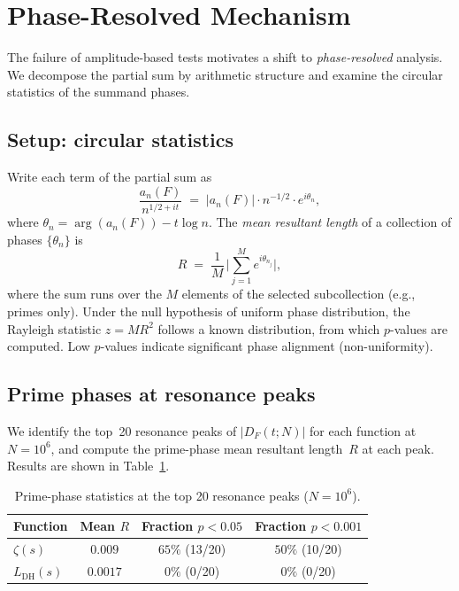 \documentclass[11pt]{amsart}
\theoremstyle{definition}
\theoremstyle{remark}
\renewcommand{\DH}{\mathrm{DH}}
\newcommand{\abs}[1]{\lvert #1 \rvert}
\begin{document}
\section{Phase-Resolved Mechanism}\label{sec:phase}

The failure of amplitude-based tests motivates a shift to
\emph{phase-resolved} analysis.  We decompose the partial sum by
arithmetic structure and examine the circular statistics of the
summand phases.

\subsection{Setup: circular statistics}

Write each term of the partial sum as
\begin{equation}
  \frac{a_n(F)}{n^{1/2+it}}
  \;=\; \abs{a_n(F)} \cdot n^{-1/2} \cdot e^{i\theta_n},
\end{equation}
where $\theta_n = \arg(a_n(F)) - t\log n$.  The \emph{mean resultant
length} of a collection of phases $\{\theta_n\}$ is
\begin{equation}\label{eq:R-stat}
  R \;=\; \frac{1}{M}\,\biggl\lvert
    \sum_{j=1}^{M} e^{i\theta_{n_j}} \biggr\rvert,
\end{equation}
where the sum runs over the $M$ elements of the selected subcollection
(e.g., primes only).  Under the null hypothesis of uniform phase
distribution, the Rayleigh statistic $z = M R^2$ follows a known
distribution, from which $p$-values are computed.  Low $p$-values
indicate significant phase alignment (non-uniformity).

\subsection{Prime phases at resonance peaks}\label{ssec:prime-phases}

We identify the top~20 resonance peaks of $\abs{D_F(t; N)}$ for each
function at $N = 10^6$, and compute the prime-phase mean resultant
length~$R$ at each peak.  Results are shown in
Table~\ref{tab:prime-phases}.

\begin{table}[ht]
\centering
\caption{Prime-phase statistics at the top 20 resonance peaks
  ($N = 10^6$).}
\label{tab:prime-phases}
\begin{tabular}{@{}lccc@{}}
\toprule
Function & Mean $R$ & Fraction $p < 0.05$ &
  Fraction $p < 0.001$ \\
\midrule
$\zeta(s)$    & $0.009$ & $65\%$ (13/20) & $50\%$ (10/20) \\
$L_{\DH}(s)$  & $0.0017$ & $0\%$ (0/20)  & $0\%$ (0/20) \\
\bottomrule
\end{tabular}
\end{table}
\end{document}
